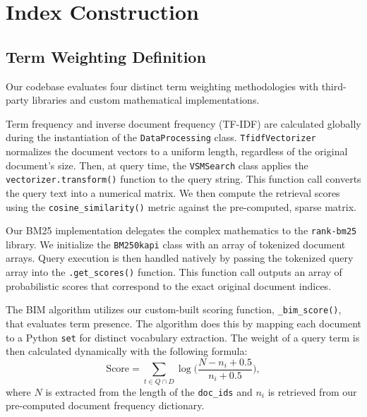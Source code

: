 \clearpage
\section*{Index Construction}
{}

\subsection*{Term Weighting Definition}
{}

Our codebase evaluates four distinct term weighting methodologies with 
third-party libraries and custom mathematical implementations.

Term frequency and inverse document frequency (TF-IDF) are calculated globally 
during the instantiation of the \texttt{DataProcessing} class. 
\texttt{TfidfVectorizer} normalizes the document vectors to a uniform length, 
regardless of the original document's size. Then, at query time, the
\texttt{VSMSearch} class applies the \texttt{vectorizer.transform()} function 
to the query string. This function call converts the query text into a 
numerical matrix. We then compute the retrieval scores using the
\texttt{cosine\_similarity()} metric against the pre-computed, sparse matrix. 

Our BM25 implementation delegates the complex mathematics to the 
\texttt{rank-bm25} library. We initialize the \texttt{BM250kapi} class with 
an array of tokenized document arrays. Query execution is then handled natively 
by passing the tokenized query array into the \texttt{.get\_scores()} function.
This function call outputs an array of probabilistic scores that correspond 
to the exact original document indices. 

The BIM algorithm utilizes our custom-built scoring function, 
\texttt{\_bim\_score()}, that evaluates term presence. The algorithm does this 
by mapping each document to a Python \texttt{set} for distinct vocabulary 
extraction. The weight of a query term is then calculated dynamically with the 
following formula:
$$\text{Score} = \sum_{t \in Q \cap D} \log \Bigg(\frac{N-n_i+0.5}
{n_i+0.5}\Bigg),$$
where $N$ is extracted from the length of the \texttt{doc\_ids} and $n_i$ 
is retrieved from our pre-computed document frequency dictionary.

